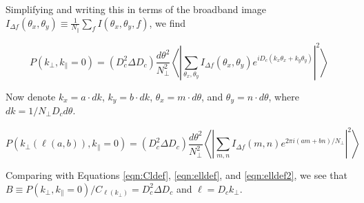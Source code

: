 \documentclass[preprint]{aastex}
\begin{document}
Simplifying and writing this in terms of the broadband image $I_{\Delta f}(\theta_x,\theta_y)\equiv\frac{1}{N_\parallel}\sum_f  I(\theta_x,\theta_y,f)$, we find

\begin{equation}
P(k_\perp,k_\parallel=0) =(D_c^2 \Delta D_c)
\frac{d\theta^2}{N_\perp^2}\left\langle\left|\sum_{\theta_x,\theta_y}I_{\Delta f}(\theta_x,\theta_y)e^{iD_c(k_x\theta_x+k_y\theta_y)}\right|^2\right\rangle
\end{equation}

Now denote $k_x=a\cdot dk$, $k_y=b\cdot dk$, $\theta_x=m\cdot d\theta$, and $\theta_y=n\cdot d\theta$, where $dk = 1/N_\perp D_c d\theta$. 

\begin{equation}
P(k_\perp(\ell(a,b)),k_\parallel=0) =(D_c^2 \Delta D_c)
\frac{d\theta^2}{N_\perp^2}\left\langle\left|\sum_{m,n}I_{\Delta f}(m,n)e^{2\pi i(am + bn)/N_\perp}\right|^2\right\rangle
\end{equation}

Comparing with Equations \ref{eqn:Cldef}, \ref{eqn:elldef}, and \ref{eqn:elldef2}, we see that $B\equiv P(k_\perp,k_\parallel=0)/ C_{\ell(k_\perp)}=D_c^2 \Delta D_c$ and $\ell=D_c k_\perp$.




%

\end{document}
